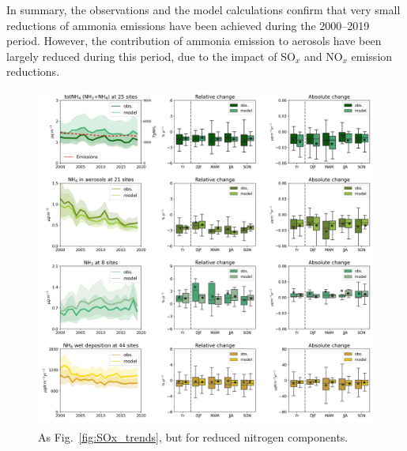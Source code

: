 In summary, the observations and the model calculations confirm that very small reductions of ammonia emissions have been achieved during the 2000--2019 period. However, the contribution of ammonia emission to aerosols have been largely reduced during this period, due to the impact of SO$_x$ and NO$_x$ emission reductions.




\begin{figure}
	\centering
	\includegraphics[width=0.74\paperwidth]{FIGS_TRENDS/Nred_trends.png}
	\caption{\label{fig:Nred_trends} As Fig.~\ref{fig:SOx_trends}, but for reduced nitrogen components.
	}
\end{figure}

